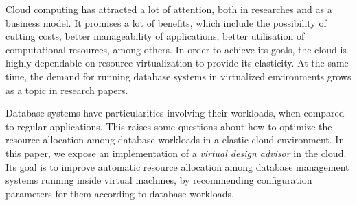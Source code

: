 Cloud computing has attracted a lot of attention, both in researches and as a business model. It promises a lot of benefits, which include the possibility of cutting costs, better manageability of applications, better utilisation of computational resources, among others. In order to achieve its goals, the cloud is highly dependable on resource virtualization to provide its elasticity. At the same time, the demand for running database systems in virtualized environments grows as a topic in research papers. %

Database systems have particularities involving their workloads, when compared to regular applications. This raises some questions about how to optimize the resource allocation among database workloads in a elastic cloud environment. In this paper, we expose an implementation of a \textit{virtual design advisor} in the cloud. Its goal is to improve automatic resource allocation among database management systems running inside virtual machines, by recommending configuration parameters for them according to database workloads. %